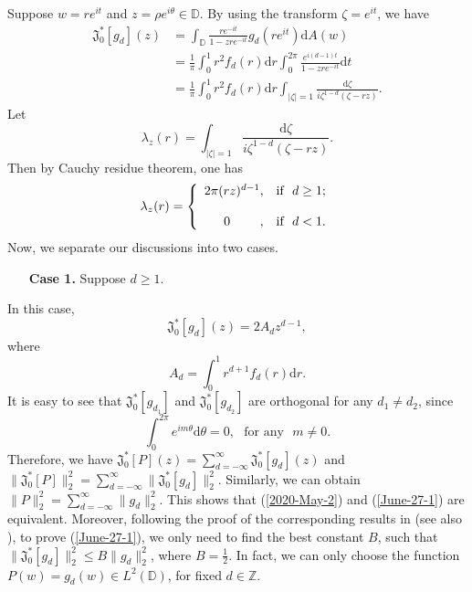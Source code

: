 \documentclass[a4paper,12pt]{amsart}
\theoremstyle{definition}
\numberwithin{equation}{section}
\newcommand{\ID}{{\mathbb D}}
\begin{document}
Suppose $w=re^{it}$ and $z=\rho e^{i\theta}\in\ID$.
By using the transform $\zeta=e^{it}$, we have
\begin{align*}
\mathfrak{J}_0^*[g_d](z)&=\int_{\ID}\frac{re^{-it}}{1-zre^{-it}}g_d(re^{it})\mathrm{d}A(w) \\ \nonumber
&=\frac{1}{\pi}\int_0^1r^2f_d(r)\mathrm{d}r\int_0^{2\pi}\frac{e^{i(d-1)t}}{1-zre^{-it}}\mathrm{d}t\\ \nonumber
&=\frac{1}{\pi}\int_0^1r^2f_d(r)\mathrm{d}r\int_{|\zeta|=1}\frac{\mathrm{d}\zeta}{i\zeta^{1-d}(\zeta-rz)}.
\end{align*}
Let $$\lambda_z(r)=\int_{|\zeta|=1}\frac{\mathrm{d}\zeta}{i\zeta^{1-d}(\zeta-rz)}.$$
Then by Cauchy residue theorem,
one has
$$\lambda_z(r)=\left\{
\begin{array}
{r@{\ }l}
2\pi(rz)^{d-1}, \ \  & \mbox{if}\ \  d\geq1;\\
\\
0 \ \ \ \ \ \ \ ,\ \ & \mbox{if}\ \  d<1.
\end{array}\right.$$
Now, we separate our discussions into two cases.
\begin{itemize}
  \item[{\bf Case 1.}]  Suppose $d\geq1$.
\end{itemize}
In this case,
$$\mathfrak{J}_0^*[g_d](z)=2A_dz^{d-1},$$
where
$$A_d=\int_0^1r^{d+1}f_d(r)\mathrm{d}r.$$
It is easy to see that $\mathfrak{J}_0^*[g_{d_1}]$ and $\mathfrak{J}_0^*[g_{d_2}]$ are orthogonal for any $d_1\neq d_2$, since
$$\int_{0}^{2\pi} e^{im\theta}\mathrm{d}\theta=0,\ \ \ \mbox{for any}\ \ \ m\neq0.$$
Therefore, we have $\mathfrak{J}_0^*[P](z)=\sum_{d=-\infty}^{\infty}\mathfrak{J}_0^*[g_d](z)$ and $\|\mathfrak{J}_0^*[P]\|_2^2=\sum_{d=-\infty}^{\infty}\|\mathfrak{J}_0^*[g_d]\|_{2}^2$.
Similarly, we can obtain $\|P\|_2^2=\sum_{d=-\infty}^{\infty}\|g_d\|_{2}^2.$
This shows that (\ref{2020-May-2}) and (\ref{June-27-1}) are equivalent.
Moreover, following the proof of the corresponding results in \cite[Theorem 5.2]{kalaj1} (see also \cite[Page 180]{Anderson}), to prove (\ref{June-27-1}), we only need to find the best constant $B$, such that
$\|\mathfrak{J}_0^*[g_d]\|_2^2\leq B\|g_d\|_2^2$, where $B=\frac{1}{2}$. In fact, we can only choose the function $P(w)=g_d(w)\in L^2(\ID)$, for fixed $d\in \mathbb{Z}$.
\end{document}
